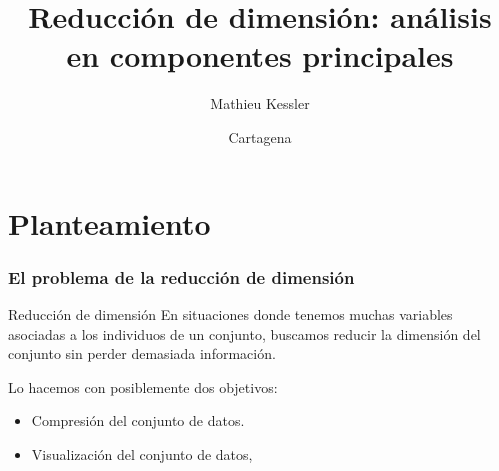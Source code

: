 \documentclass{beamer}
\title{Reducción de dimensión: análisis en componentes principales }
\author[Kessler]{Mathieu Kessler}
\institute[UPCT]{
  Departamento de Matemática Aplicada y Estadística\\
  Universidad Politécnica de Cartagena}
\date[Cartagena]{Cartagena}
\begin{document}
\begin{frame}
  \titlepage
\end{frame}
   \section{Planteamiento}
 \begin{frame}\frametitle{El problema de la reducción de dimensión}
   \begin{block}{Reducción de dimensión}
     En situaciones donde tenemos muchas variables asociadas a los individuos de un conjunto, buscamos reducir la dimensión del conjunto sin perder demasiada información. 
   \end{block}
    Lo hacemos con posiblemente dos objetivos:
      \begin{itemize}
     \item<+-> Compresión del conjunto de datos.
     \item<+> Visualización del conjunto de datos,
     \end{itemize}
 \end{frame}
\end{document}
